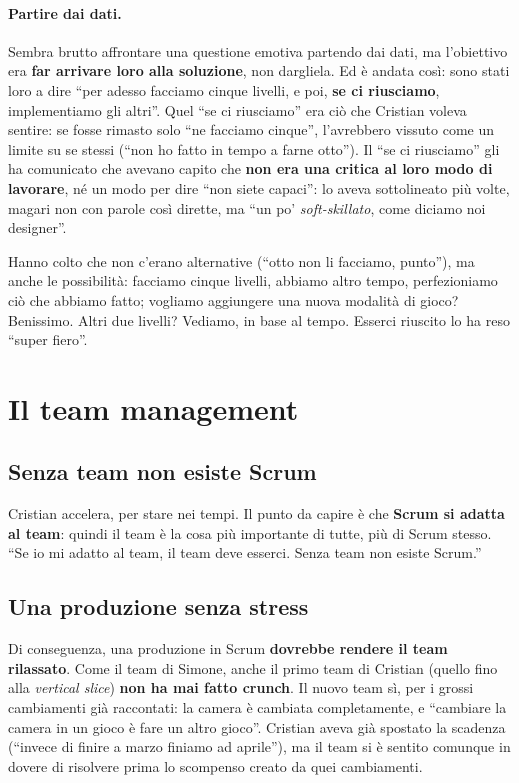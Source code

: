 \paragraph{Partire dai dati.} Sembra brutto affrontare una questione emotiva
partendo dai dati, ma l'obiettivo era \textbf{far arrivare loro alla soluzione},
non dargliela. Ed è andata così: sono stati loro a dire ``per adesso facciamo
cinque livelli, e poi, \textbf{se ci riusciamo}, implementiamo gli altri''.
Quel ``se ci riusciamo'' era ciò che Cristian voleva sentire: se fosse rimasto
solo ``ne facciamo cinque'', l'avrebbero vissuto come un limite su se stessi
(``non ho fatto in tempo a farne otto''). Il ``se ci riusciamo'' gli ha
comunicato che avevano capito che \textbf{non era una critica al loro modo di
lavorare}, né un modo per dire ``non siete capaci'': lo aveva sottolineato più
volte, magari non con parole così dirette, ma ``un po' \emph{soft-skillato},
come diciamo noi designer''.

Hanno colto che non c'erano alternative (``otto non li facciamo, punto''), ma
anche le possibilità: facciamo cinque livelli, abbiamo altro tempo,
perfezioniamo ciò che abbiamo fatto; vogliamo aggiungere una nuova modalità di
gioco? Benissimo. Altri due livelli? Vediamo, in base al tempo. Esserci
riuscito lo ha reso ``super fiero''.

\section{Il team management}
\label{sec:z3-team}

\subsection{Senza team non esiste Scrum}

Cristian accelera, per stare nei tempi. Il punto da capire è che
\textbf{Scrum si adatta al team}: quindi il team è la cosa più importante di
tutte, più di Scrum stesso. ``Se io mi adatto al team, il team deve esserci.
Senza team non esiste Scrum.''

\subsection{Una produzione senza stress}

Di conseguenza, una produzione in Scrum \textbf{dovrebbe rendere il team
rilassato}. Come il team di Simone, anche il primo team di Cristian (quello fino
alla \emph{vertical slice}) \textbf{non ha mai fatto crunch}. Il nuovo team sì,
per i grossi cambiamenti già raccontati: la camera è cambiata completamente, e
``cambiare la camera in un gioco è fare un altro gioco''. Cristian aveva già
spostato la scadenza (``invece di finire a marzo finiamo ad aprile''), ma il team
si è sentito comunque in dovere di risolvere prima lo scompenso creato da quei
cambiamenti.

